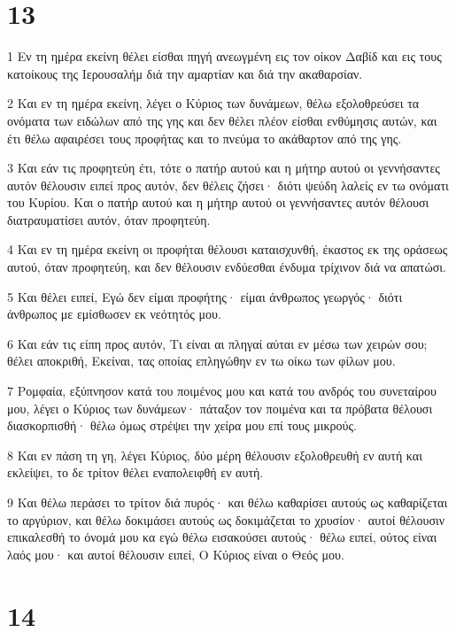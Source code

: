 \chapter{13}

\par 1 Εν τη ημέρα εκείνη θέλει είσθαι πηγή ανεωγμένη εις τον οίκον Δαβίδ και εις τους κατοίκους της Ιερουσαλήμ διά την αμαρτίαν και διά την ακαθαρσίαν.
\par 2 Και εν τη ημέρα εκείνη, λέγει ο Κύριος των δυνάμεων, θέλω εξολοθρεύσει τα ονόματα των ειδώλων από της γης και δεν θέλει πλέον είσθαι ενθύμησις αυτών, και έτι θέλω αφαιρέσει τους προφήτας και το πνεύμα το ακάθαρτον από της γης.
\par 3 Και εάν τις προφητεύη έτι, τότε ο πατήρ αυτού και η μήτηρ αυτού οι γεννήσαντες αυτόν θέλουσιν ειπεί προς αυτόν, δεν θέλεις ζήσει· διότι ψεύδη λαλείς εν τω ονόματι του Κυρίου. Και ο πατήρ αυτού και η μήτηρ αυτού οι γεννήσαντες αυτόν θέλουσι διατραυματίσει αυτόν, όταν προφητεύη.
\par 4 Και εν τη ημέρα εκείνη οι προφήται θέλουσι καταισχυνθή, έκαστος εκ της οράσεως αυτού, όταν προφητεύη, και δεν θέλουσιν ενδύεσθαι ένδυμα τρίχινον διά να απατώσι.
\par 5 Και θέλει ειπεί, Εγώ δεν είμαι προφήτης· είμαι άνθρωπος γεωργός· διότι άνθρωπος με εμίσθωσεν εκ νεότητός μου.
\par 6 Και εάν τις είπη προς αυτόν, Τι είναι αι πληγαί αύται εν μέσω των χειρών σου; θέλει αποκριθή, Εκείναι, τας οποίας επληγώθην εν τω οίκω των φίλων μου.
\par 7 Ρομφαία, εξύπνησον κατά του ποιμένος μου και κατά του ανδρός του συνεταίρου μου, λέγει ο Κύριος των δυνάμεων· πάταξον τον ποιμένα και τα πρόβατα θέλουσι διασκορπισθή· θέλω όμως στρέψει την χείρα μου επί τους μικρούς.
\par 8 Και εν πάση τη γη, λέγει Κύριος, δύο μέρη θέλουσιν εξολοθρευθή εν αυτή και εκλείψει, το δε τρίτον θέλει εναπολειφθή εν αυτή.
\par 9 Και θέλω περάσει το τρίτον διά πυρός· και θέλω καθαρίσει αυτούς ως καθαρίζεται το αργύριον, και θέλω δοκιμάσει αυτούς ως δοκιμάζεται το χρυσίον· αυτοί θέλουσιν επικαλεσθή το όνομά μου κα εγώ θέλω εισακούσει αυτούς· θέλω ειπεί, ούτος είναι λαός μου· και αυτοί θέλουσιν ειπεί, Ο Κύριος είναι ο Θεός μου.

\chapter{14}


